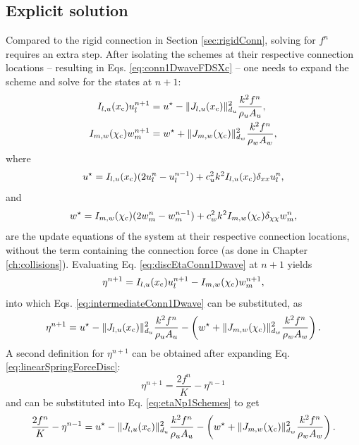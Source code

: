 \subsection{Explicit solution}\label{sec:explicitSolutionSpringConn}
Compared to the rigid connection in Section \ref{sec:rigidConn}, solving for $f^n$ requires an extra step. After isolating the schemes at their respective connection locations -- resulting in Eqs. \eqref{eq:conn1DwaveFDSXc} -- one needs to expand the scheme and solve for the states at $n+1$:
\begin{subequations}\label{eq:intermediateConn1Dwave}
    \begin{align}
        I_{l, u}(x_{\text{c}}) u_l^{n+1} &= u^\star - \lVert J_{l, u}(x_{\text{c}})\rVert_{d_u}^2 \frac{k^2f^n}{\rho_u A_u},\\
        I_{m, w}(\chi_{\text{c}}) w_m^{n+1} &= w^\star + \lVert J_{m, w}(\chi_{\text{c}})\rVert_{d_w}^2 \frac{k^2f^n}{\rho_w A_w},
    \end{align}
\end{subequations}
where
\begin{equation*}
    u^\star = I_{l, u}(x_{\text{c}})(2u_l^n - u_l^{n-1}) + c_u^2k^2I_{l, u}(x_{\text{c}})\delta_{xx}u_l^n,
\end{equation*}
and
\begin{equation*}
    w^\star = I_{m, w}(\chi_{\text{c}})(2w_m^n - w_m^{n-1}) + c_w^2k^2I_{m, w}(\chi_{\text{c}})\delta_{\chi\chi}w_m^n,
\end{equation*}
are the update equations of the system at their respective connection locations, without the term containing the connection force (as done in Chapter \ref{ch:collisions}). Evaluating Eq. \eqref{eq:discEtaConn1Dwave} at $n+1$ yields
\begin{equation*}
    \eta^{n+1} = I_{l, u}(x_{\text{c}}) u_l^{n+1} - I_{m, w}(\chi_{\text{c}}) w_m^{n+1},
\end{equation*}
into which Eqs. \eqref{eq:intermediateConn1Dwave} can be substituted, as
\begin{equation}\label{eq:etaNp1Schemes}
    \eta^{n+1} = u^\star - \lVert J_{l, u}(x_{\text{c}})\rVert_{d_u}^2 \frac{k^2f^n}{\rho_u A_u} - \left(w^\star + \lVert J_{m, w}(\chi_{\text{c}})\rVert_{d_w}^2 \frac{k^2f^n}{\rho_w A_w}\right).
\end{equation}
A second definition for $\eta^{n+1}$ can be obtained after expanding Eq. \eqref{eq:linearSpringForceDisc}:
\begin{equation}\label{eq:etaExpanded}
    \eta^{n+1} = \frac{2 f^n}{K} - \eta^{n-1}
\end{equation}
and can be substituted into Eq. \eqref{eq:etaNp1Schemes} to get
\begin{equation}
    \frac{2 f^n}{K} - \eta^{n-1} = u^\star - \lVert J_{l, u}(x_{\text{c}})\rVert_{d_u}^2 \frac{k^2f^n}{\rho_u A_u} - \left(w^\star + \lVert J_{m, w}(\chi_{\text{c}})\rVert_{d_w}^2 \frac{k^2f^n}{\rho_w A_w}\right).
\end{equation}
